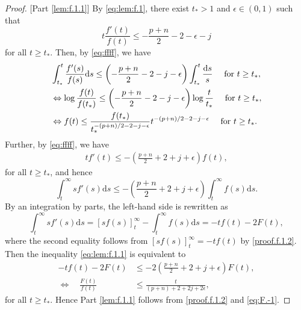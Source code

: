 \documentclass[preprint,11pt]{imsart}
\numberwithin{equation}{section}
\theoremstyle{plain}
\theoremstyle{definition}
\theoremstyle{remark}
\newcommand{\rd}{\mathrm{d}}
\begin{document}
\begin{proof}\mbox{}
[Part \ref{lem:f.1.1}] By \eqref{eq:lem:f.1}, there exist $t_*>1$ and $\epsilon\in(0,1)$ such that
\begin{equation}\label{eq:ffff}
 t\frac{f'(t)}{f(t)}\leq -\frac{p+n}{2}-2-\epsilon-j
\end{equation}
for all $t\geq t_*$.
Then, by \eqref{eq:ffff}, we have
\begin{align}
& \int_{t_*}^t \frac{f'(s)}{f(s)} \rd s
 \leq \left(-\frac{p+n}{2}-2-j-\epsilon\right) \int_{t_*}^t\frac{ \rd s}{s} \quad\text{ for }t\geq t_*, \notag \\
&\Leftrightarrow \log \frac{f(t)}{f(t_*)} \leq \left(-\frac{p+n}{2}-2-j-\epsilon\right)\log \frac{t}{t_*} \quad\text{ for }t\geq t_*, \notag \\
& \Leftrightarrow  f(t)\leq \frac{f(t_*)}{t_*^{-(p+n)/2-2-j-\epsilon}}t^{-(p+n)/2-2-j-\epsilon}
 \quad\text{ for }t\geq t_*. \label{proof.f.1.2}
\end{align}
Further, by \eqref{eq:ffff}, we have
\begin{align*}
 t f'(t) \leq -\left(\frac{p+n}{2}+2+j+\epsilon\right)f(t),
\end{align*}
for all $t\geq t_*$, and hence
 \begin{equation}\label{eq:lem:f.1.1}
 \int_t^\infty s f'(s)\rd s \leq -\left(\frac{p+n}{2}+2+j+\epsilon\right)\int_t^\infty f(s)\rd s.  
 \end{equation}
 By an integration by parts, the left-hand side
 is rewritten as
 \begin{equation*}
  \int_t^\infty s f'(s)\rd s
   =[sf(s)]_t^\infty - \int_t^\infty  f(s)\rd s   = -tf(t)- 2F(t),
 \end{equation*}
 where the second equality follows from $[sf(s)]_t^\infty=-tf(t)$  by \eqref{proof.f.1.2}.
Then the inequality \eqref{eq:lem:f.1.1} is equivalent to
\begin{equation}\label{eq:F.-1}
 \begin{split}
 -tf(t)- 2F(t) &\leq -2\left(\frac{p+n}{2}+2+j+\epsilon\right)F(t), \\
\Leftrightarrow\quad  \frac{F(t)}{f(t)}&\leq\frac{t}{(p+n)+2+2j+2\epsilon},
 \end{split}
\end{equation} 
for all $t\geq t_*$. Hence Part \ref{lem:f.1.1} follows from \eqref{proof.f.1.2} and \eqref{eq:F.-1}.

 \medskip


\end{proof}
\end{document}
